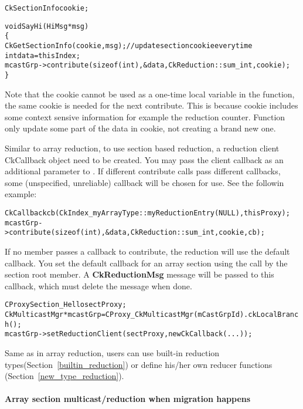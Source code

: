 \begin{alltt}
  CkSectionInfo cookie;

  void SayHi(HiMsg *msg)
  \{
    CkGetSectionInfo(cookie, msg);     // update section cookie every time
    int data = thisIndex;
    mcastGrp->contribute(sizeof(int), &data, CkReduction::sum_int, cookie);
  \}
\end{alltt}

Note that the cookie cannot be used as a one-time local variable in the 
function, the same cookie is needed for the next contribute. This is 
because cookie includes some context sensive information for example the 
reduction counter. Function  only update some part 
of the data in cookie, not creating a brand new one.

Similar to array reduction, to use section based reduction, a reduction
client CkCallback object need to be created. You may pass the client callback 
as an additional parameter to . If different contribute calls 
pass different callbacks, some (unspecified, unreliable) callback will be 
chosen for use. See the followin example:

\begin{alltt}
    CkCallback cb(CkIndex_myArrayType::myReductionEntry(NULL),thisProxy); 
    mcastGrp->contribute(sizeof(int), &data, CkReduction::sum_int, cookie, cb);
\end{alltt}

If no member passes a callback to contribute, the reduction will use the 
default callback. You set the default callback for an array section using the 
 call by the section root member. A 
{\bf CkReductionMsg} message will be passed to this callback, which 
must delete the message when done.

\begin{alltt}
  CProxySection_Hello sectProxy;
  CkMulticastMgr *mcastGrp = CProxy_CkMulticastMgr(mCastGrpId).ckLocalBranch();
  mcastGrp->setReductionClient(sectProxy, new CkCallback(...));
\end{alltt}

Same as in array reduction, users can use built-in reduction 
types(Section~\ref{builtin_reduction}) or define his/her own reducer functions
(Section~\ref{new_type_reduction}).

\paragraph{Array section multicast/reduction when migration happens}

